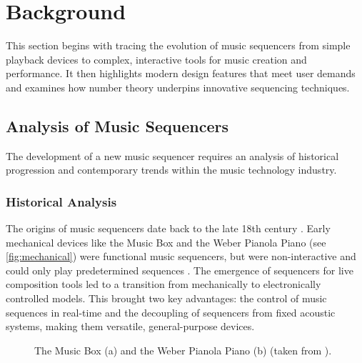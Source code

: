 \documentclass[12pt]{article}
\numberwithin{subsubsubsection}{subsubsection}
\begin{document}
\section{Background}
\label{appendix:background}

This section begins with tracing the evolution of music sequencers from simple playback devices to complex, interactive tools for music creation and performance. It then highlights modern design features that meet user demands and examines how number theory underpins innovative sequencing techniques.

\subsection{Analysis of Music Sequencers}
\label{appendix:analysis}

The development of a new music sequencer requires an analysis of historical progression and contemporary trends within the music technology industry.

\subsubsection{Historical Analysis}

The origins of music sequencers date back to the late 18th century \cite{Bresin}. Early mechanical devices like the Music Box and the Weber Pianola Piano (see \autoref{fig:mechanical}) were functional music sequencers, but were non-interactive and could only play predetermined sequences \cite{Bresin}. The emergence of sequencers for live composition tools led to a transition from mechanically to electronically controlled models. This brought two key advantages: the control of music sequences in real-time and the decoupling of sequencers from fixed acoustic systems, making them versatile, general-purpose devices.

\begin{figure}[ht]
    \centering
    \caption{The Music Box (a) and the Weber Pianola Piano (b) (taken from \cite{Bresin}).}
    \label{fig:mechanical}
\end{figure}
\end{document}

